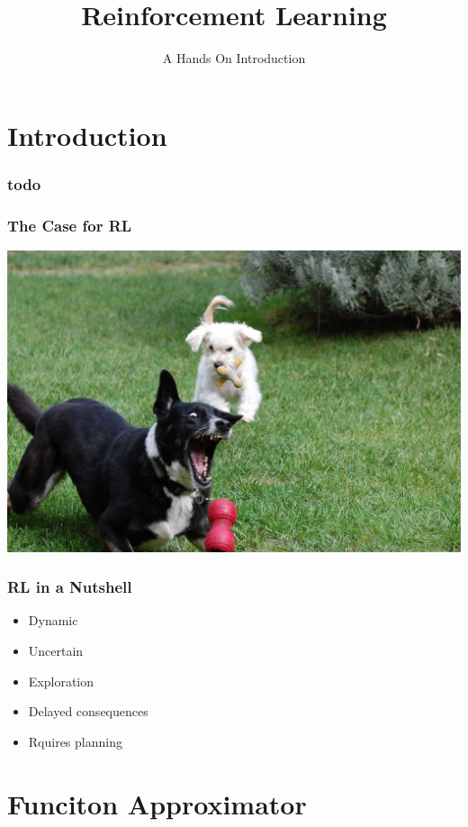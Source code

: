 \documentclass{beamer}
\begin{document}
\title{Reinforcement Learning}
\subtitle{A Hands On Introduction}
\frame{\titlepage}

\section{Introduction}
\begin{frame}
  \frametitle{todo}
  \tableofcontents[currentsection]
\end{frame}

\begin{frame}
  \frametitle{The Case for RL}
  \begin{center}
    \hspace{-1.0cm}
    \vspace{-2.0cm}
    \includegraphics[scale=0.4]{assets/dog.jpg}
  \end{center}

\end{frame} 

\begin{frame}
  \frametitle{RL in a Nutshell}
  \begin{itemize}
  \item Dynamic
  \item Uncertain
  \item Exploration
  \item Delayed consequences
  \item Rquires planning
  \end{itemize} 
\end{frame}



\section{Funciton Approximator}
\end{document}
